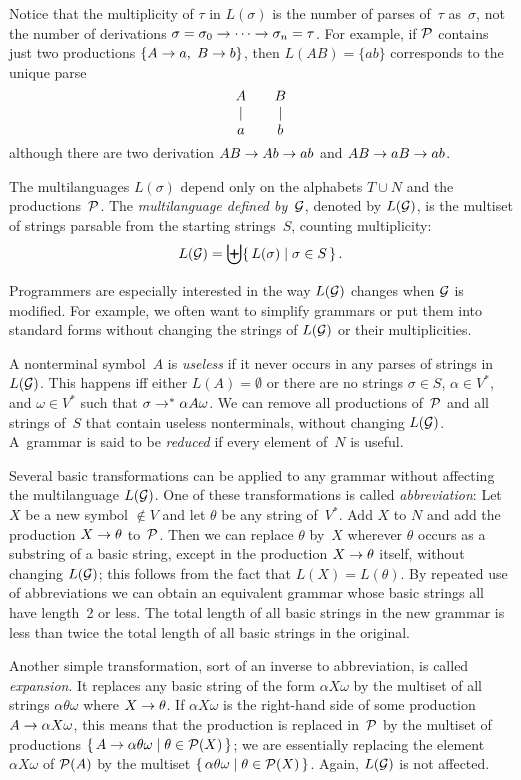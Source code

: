 Notice that the multiplicity of $\tau$ in $L(\sigma)$ is the number of
parses of~$\tau$ as~$\sigma$, not the number of derivations
$\sigma=\sigma_0\rightarrow\cdots\rightarrow\sigma_n=\tau$. For
example, if ${\cal P}$ contains just two productions $\{A\rightarrow a,$ 
{}$B\rightarrow b\}$, then $L(AB)=\{ab\}$ corresponds to the unique
parse
$$\vcenter{\halign{\hfil$#$\hfil\qquad&\hfil$#$\hfil\cr
A&B\cr
\vert&\vert\cr
a&b\cr}}$$
although there are two derivation $AB\rightarrow Ab\rightarrow ab$
and $AB\rightarrow aB\rightarrow ab$. 

The multilanguages $L(\sigma)$ depend only on the alphabets $T\cup N$
and the productions~${\cal P}$. The {\it multilanguage defined
by\/}~${\cal G}$, denoted by $L({\cal G})$, is the multiset of strings
parsable from the starting strings~$S$, counting multiplicity:
$$L({\cal G})=\biguplus\{\,L(\sigma)\mid \sigma\in S\,\}\,.$$

\enspace
Programmers are especially interested in the way
$L({\cal G})$ changes when ${\cal G}$ is modified. For example, we
often want to simplify grammars or put them into standard forms
without changing the strings of $L({\cal G})$ or their multiplicities.

A nonterminal symbol~$A$ is {\it useless\/} if it never occurs in any
parses of strings in $L({\cal G})$. This happens iff either
$L(A)=\emptyset$ or there are no strings $\sigma\in S$, $\alpha\in
V^{\ast}$, and $\omega\in V^{\ast}$ such that
$\sigma\rightarrow^{\ast} \alpha A\omega$. We can remove all
productions of~${\cal P}$ and all strings of~$S$ that contain useless
nonterminals, without changing $L({\cal G})$. A~grammar is said to be
{\it reduced\/} if every element of~$N$ is useful.

Several basic transformations can be applied to any grammar without
affecting the multilanguage $L({\cal G})$. One of these
transformations is called {\it abbreviation\/}: 
Let $X$ be a new symbol $\notin V$ and let $\theta$ be any string
of~$V^{\ast}$. Add $X$ to $N$ and add the production
$X\rightarrow\theta$ to~${\cal P}$. Then we can replace $\theta$
by~$X$ wherever $\theta$ occurs as a substring of a basic string,
except in the production $X\rightarrow\theta$ itself, without changing
$L({\cal G})$; this follows from the fact that $L(X)=L(\theta)$. By
repeated use of abbreviations we can obtain an equivalent grammar
whose basic strings all have length~2 or less. The total length of all
basic strings in the new grammar is less than twice the total length
of all basic strings in the original.

Another simple transformation, sort of an inverse to abbreviation, is
called {\it expansion}. It replaces any basic string of the form
$\alpha X\omega$ by the multiset of all strings $\alpha\theta\omega$
where $X\rightarrow\theta$. If $\alpha X\omega$ is the right-hand side
of some production $A\rightarrow\alpha X\omega$, this means that the
production is replaced in~${\cal P}$ by the multiset of productions
$\{\,A\rightarrow\alpha\theta\omega\mid\theta\in{\cal P}(X)\,\}$; we
are essentially replacing the element $\alpha X\omega$ of ${\cal
P}(A)$ by the multiset $\{\,\alpha\theta\omega\mid\theta\in{\cal
P}(X)\,\}$. 
Again, $L({\cal G})$ is not affected.

